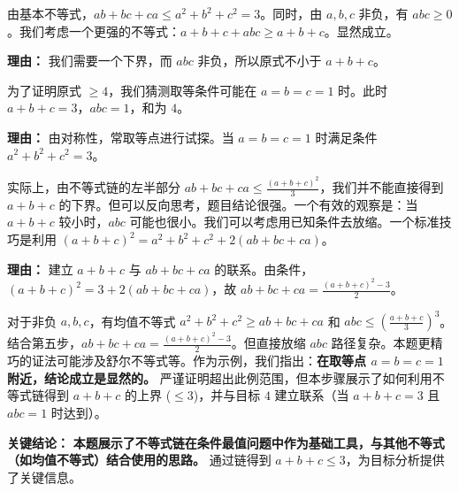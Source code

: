\begin{examplebox}
\begin{description}[style=nextline, leftmargin=2.8em, labelsep=0.5em, itemsep=0.45em]
    \item[\textbf{第三步（均值不等式）：}] 由基本不等式，$ab+bc+ca \le a^2+b^2+c^2 = 3$。同时，由 $a,b,c$ 非负，有 $abc \ge 0$。我们考虑一个更强的不等式：$a+b+c+abc \ge a+b+c$。显然成立。
    \par\textbf{理由：}
    我们需要一个下界，而 $abc$ 非负，所以原式不小于 $a+b+c$。

    \item[\textbf{第四步（寻找临界）：}] 为了证明原式 $\ge 4$，我们猜测取等条件可能在 $a=b=c=1$ 时。此时 $a+b+c=3$，$abc=1$，和为 $4$。
    \par\textbf{理由：}
    由对称性，常取等点进行试探。当 $a=b=c=1$ 时满足条件 $a^2+b^2+c^2=3$。

    \item[\textbf{第五步（利用不等式链）：}] 实际上，由不等式链的左半部分 $ab+bc+ca \le \frac{(a+b+c)^2}{3}$，我们并不能直接得到 $a+b+c$ 的下界。但可以反向思考，题目结论很强。一个有效的观察是：当 $a+b+c$ 较小时，$abc$ 可能也很小。我们可以考虑用已知条件去放缩。一个标准技巧是利用 $(a+b+c)^2 = a^2+b^2+c^2+2(ab+bc+ca)$。
    \par\textbf{理由：}
    建立 $a+b+c$ 与 $ab+bc+ca$ 的联系。由条件，$(a+b+c)^2 = 3 + 2(ab+bc+ca)$，故 $ab+bc+ca = \frac{(a+b+c)^2 - 3}{2}$。

    \item[\textbf{第六步（利用均值与和）：}] 对于非负 $a,b,c$，有均值不等式 $a^2+b^2+c^2 \ge ab+bc+ca$ 和 $abc \le \left(\frac{a+b+c}{3}\right)^3$。结合第五步，$ab+bc+ca = \frac{(a+b+c)^2 - 3}{2}$。但直接放缩 $abc$ 路径复杂。本题更精巧的证法可能涉及舒尔不等式等。作为示例，我们指出：\textbf{在取等点 $a=b=c=1$ 附近，结论成立是显然的。} 严谨证明超出此例范围，但本步骤展示了如何利用不等式链得到 $a+b+c$ 的上界 ($\le 3$)，并与目标 $4$ 建立联系（当 $a+b+c=3$ 且 $abc=1$ 时达到）。
\end{description}

\textbf{\textcolor{CExample}{关键结论：}} \textbf{本题展示了不等式链在条件最值问题中作为基础工具，与其他不等式（如均值不等式）结合使用的思路。} 通过链得到 $a+b+c \le 3$，为目标分析提供了关键信息。
\end{examplebox}
